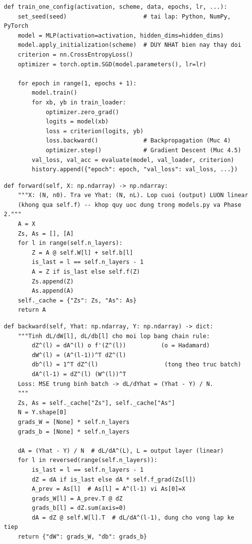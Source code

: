 \documentclass[12pt,a4paper]{report}
\begin{document}
\begin{lstlisting}[caption={Vòng lặp huấn luyện, rút gọn (trích từ src/training.py)}]
def train_one_config(activation, scheme, data, epochs, lr, ...):
    set_seed(seed)                      # tai lap: Python, NumPy, PyTorch
    model = MLP(activation=activation, hidden_dims=hidden_dims)
    model.apply_initialization(scheme)  # DUY NHAT bien nay thay doi
    criterion = nn.CrossEntropyLoss()
    optimizer = torch.optim.SGD(model.parameters(), lr=lr)

    for epoch in range(1, epochs + 1):
        model.train()
        for xb, yb in train_loader:
            optimizer.zero_grad()
            logits = model(xb)
            loss = criterion(logits, yb)
            loss.backward()             # Backpropagation (Muc 4)
            optimizer.step()            # Gradient Descent (Muc 4.5)
        val_loss, val_acc = evaluate(model, val_loader, criterion)
        history.append({"epoch": epoch, "val_loss": val_loss, ...})
\end{lstlisting}

\begin{lstlisting}[caption={Forward pass -- src/manual\_nn.py}]
def forward(self, X: np.ndarray) -> np.ndarray:
    """X: (N, n0). Tra ve Yhat: (N, nL). Lop cuoi (output) LUON linear
    (khong qua self.f) -- khop quy uoc dung trong models.py va Phase 2."""
    A = X
    Zs, As = [], [A]
    for l in range(self.n_layers):
        Z = A @ self.W[l] + self.b[l]
        is_last = l == self.n_layers - 1
        A = Z if is_last else self.f(Z)
        Zs.append(Z)
        As.append(A)
    self._cache = {"Zs": Zs, "As": As}
    return A
\end{lstlisting}

\begin{lstlisting}[caption={Backward pass -- src/manual\_nn.py (nguyên văn công thức Mục~\ref{sec:matrixform})}]
def backward(self, Yhat: np.ndarray, Y: np.ndarray) -> dict:
    """Tinh dL/dW[l], dL/db[l] cho moi lop bang chain rule:
        dZ^(l) = dA^(l) o f'(Z^(l))          (o = Hadamard)
        dW^(l) = (A^(l-1))^T dZ^(l)
        db^(l) = 1^T dZ^(l)                   (tong theo truc batch)
        dA^(l-1) = dZ^(l) (W^(l))^T
    Loss: MSE trung binh batch -> dL/dYhat = (Yhat - Y) / N.
    """
    Zs, As = self._cache["Zs"], self._cache["As"]
    N = Y.shape[0]
    grads_W = [None] * self.n_layers
    grads_b = [None] * self.n_layers

    dA = (Yhat - Y) / N  # dL/dA^(L), L = output layer (linear)
    for l in reversed(range(self.n_layers)):
        is_last = l == self.n_layers - 1
        dZ = dA if is_last else dA * self.f_grad(Zs[l])
        A_prev = As[l]  # As[l] = A^(l-1) vi As[0]=X
        grads_W[l] = A_prev.T @ dZ
        grads_b[l] = dZ.sum(axis=0)
        dA = dZ @ self.W[l].T  # dL/dA^(l-1), dung cho vong lap ke tiep
    return {"dW": grads_W, "db": grads_b}
\end{lstlisting}
\end{document}
